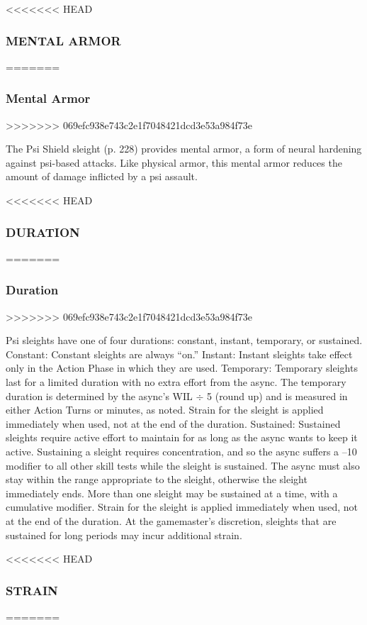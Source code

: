 <<<<<<< HEAD
\subsubsection{MENTAL ARMOR}
=======
\subsubsection{Mental Armor}
>>>>>>> 069efc938e743c2e1f7048421dcd3e53a984f73e

The Psi Shield sleight (p. 228) provides mental armor,
a form of neural hardening against psi-based attacks.
Like physical armor, this mental armor reduces the
amount of damage inflicted by a psi assault.

<<<<<<< HEAD
\subsubsection{DURATION}
=======
\subsubsection{Duration}
>>>>>>> 069efc938e743c2e1f7048421dcd3e53a984f73e

Psi sleights have one of four durations: constant, instant,
temporary, or sustained.
Constant: Constant sleights are always “on.”
Instant: Instant sleights take effect only in the
Action Phase in which they are used.
Temporary: Temporary sleights last for a limited
duration with no extra effort from the async. The
temporary duration is determined by the async’s WIL
$\div$ 5 (round up) and is measured in either Action Turns
or minutes, as noted. Strain for the sleight is applied
immediately when used, not at the end of the duration.
Sustained: Sustained sleights require active effort
to maintain for as long as the async wants to keep
it active. Sustaining a sleight requires concentration,
and so the async suffers a –10 modifier to all other
skill tests while the sleight is sustained. The async
must also stay within the range appropriate to the
sleight, otherwise the sleight immediately ends. More
than one sleight may be sustained at a time, with a
cumulative modifier. Strain for the sleight is applied
immediately when used, not at the end of the duration.
At the gamemaster’s discretion, sleights that are
sustained for long periods may incur additional strain.

<<<<<<< HEAD
\subsubsection{STRAIN}
=======
